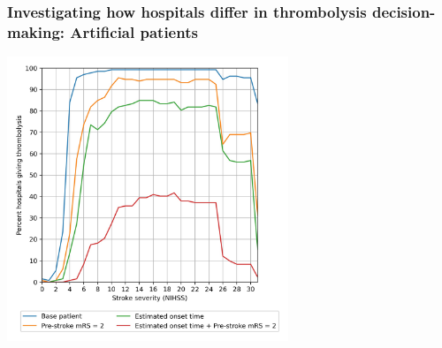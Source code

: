 \begin{frame}
\frametitle{Investigating how hospitals differ in thrombolysis decision-making: Artificial patients}

\begin{center}
\includegraphics[width=0.63\textwidth]{./images/20_synthetic_xgb_10_features_interactions}
\end{center}


\end{frame}
